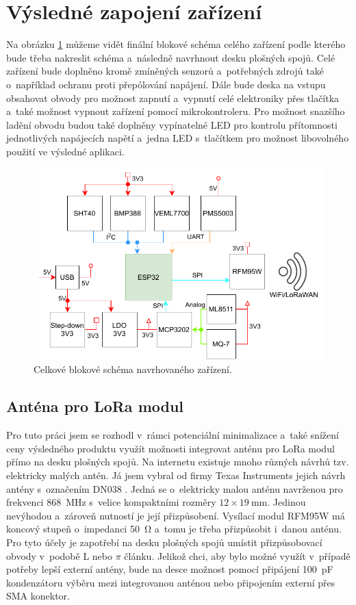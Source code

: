 \section{Výsledné zapojení zařízení}

Na obrázku \ref{fig_BlockDiagram-full} můžeme vidět finální blokové schéma celého zařízení podle kterého bude třeba nakreslit schéma a~následně navrhnout desku plošných spojů. Celé zařízení bude doplněno kromě zmíněných senzorů a~potřebných zdrojů také o~například ochranu proti přepólování napájení. Dále bude deska na vstupu obsahovat obvody pro možnost zapnutí a~vypnutí celé elektroniky přes tlačítka a~také možnost vypnout zařízení pomocí mikrokontroleru. Pro možnost snazšího ladění obvodu budou také doplněny vypínatelné LED pro kontrolu přítomnosti jednotlivých napájecích napětí a~jedna LED s~tlačítkem pro možnost libovolného použití ve výsledné aplikaci.

\begin{figure}
    \centering
    \includegraphics[width=\textwidth]{obrazky/block_schematic-full.drawio.pdf}
    \caption{Celkové blokové schéma navrhovaného zařízení.}
    \label{fig_BlockDiagram-full}
\end{figure}

\subsection{Anténa pro LoRa modul}

Pro tuto práci jsem se rozhodl v~rámci potenciální minimalizace a~také snížení ceny výsledného produktu využít možnosti integrovat anténu pro LoRa modul přímo na desku plošných spojů. Na internetu existuje mnoho různých návrhů tzv. elektricky malých antén. Já jsem vybral od firmy Texas Instruments jejich návrh antény s~označením DN038 \cite{dat_DN038}. Jedná se o~elektricky malou anténu navrženou pro frekvenci \SI{868}{\mega\hertz} s~velice kompaktními rozměry $12\times\SI{19}{\milli\metre}$. Jedinou nevýhodou a~zároveň nutností je její přizpůsobení. Vysílací modul RFM95W má koncový stupeň o~impedanci \SI{50}{\ohm} a~tomu je třeba přizpůsobit i~danou anténu. Pro tyto účely je zapotřebí na desku plošných spojů umístit přizpůsobovací obvody v~podobě L nebo $\pi$ článku. Jelikož chci, aby bylo možné využít v~případě potřeby lepší externí antény, bude na desce možnost pomocí připájení \SI{100}{\pico\farad} kondenzátoru výběru mezi integrovanou anténou nebo připojením externí přes SMA konektor.